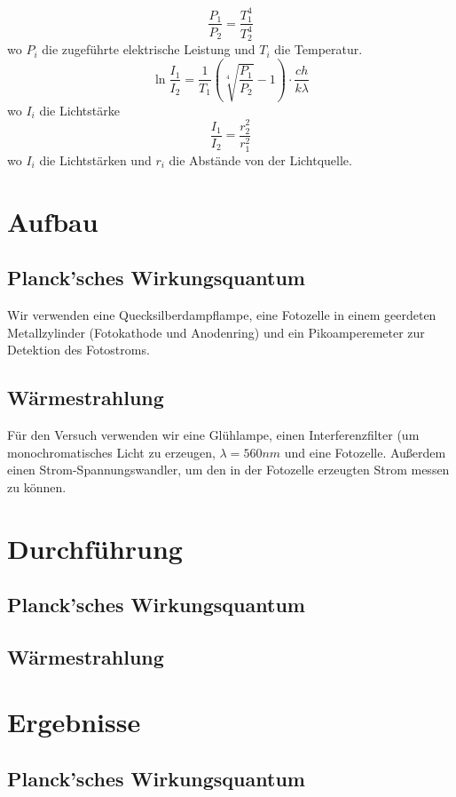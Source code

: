 \documentclass{article}
\begin{document}
$$\frac{P_1}{P_2} = \frac{T_1^4}{T_2^4}$$
wo $P_i$ die zugeführte elektrische Leistung und $T_i$ die Temperatur.
$$\ln \frac{I_1}{I_2} = \frac{1}{T_1} \left(\sqrt[4]{\frac{P_1}{P_2}}-1\right) \cdot \frac{ch}{k\lambda}$$
wo $I_i$ die Lichtstärke
$$\frac{I_1}{I_2} = \frac{r_2^2}{r_1^2}$$
wo $I_i$ die Lichtstärken und $r_i$ die Abstände von der Lichtquelle.


\section{Aufbau}
\subsection{Planck'sches Wirkungsquantum}
Wir verwenden eine Quecksilberdampflampe, eine Fotozelle in einem geerdeten Metallzylinder (Fotokathode und Anodenring) und ein Pikoamperemeter zur Detektion des Fotostroms.

\subsection{Wärmestrahlung}
Für den Versuch verwenden wir eine Glühlampe, einen Interferenzfilter (um monochromatisches Licht zu erzeugen, $\lambda=560\si{nm}$ und eine Fotozelle. Außerdem einen Strom-Spannungswandler, um den in der Fotozelle erzeugten Strom messen zu können.

\section{Durchführung}
\subsection{Planck'sches Wirkungsquantum}
\subsection{Wärmestrahlung}


\section{Ergebnisse}
\subsection{Planck'sches Wirkungsquantum}
\end{document}
